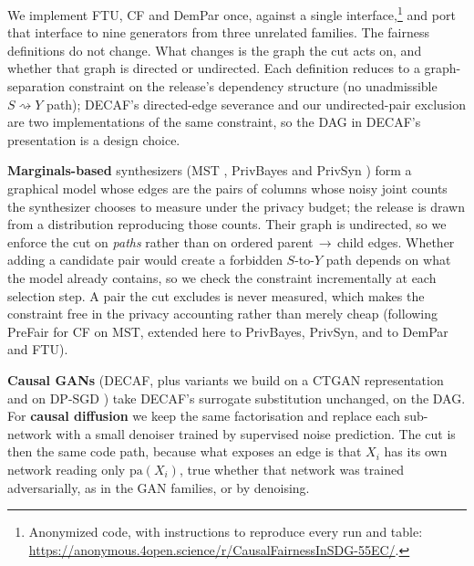 \documentclass[manuscript,screen,review]{acmart}
\begin{document}
We implement FTU, CF and DemPar once, against a single
interface,\footnote{Anonymized code, with instructions to reproduce every run
and table: \url{https://anonymous.4open.science/r/CausalFairnessInSDG-55EC/}.}
and port that interface to nine generators from three unrelated families. The
fairness definitions do not change. What changes is the graph the cut acts on,
and whether that graph is directed or undirected. Each definition reduces to
a graph-separation constraint on the release's dependency structure (no
unadmissible $S \rightsquigarrow Y$ path); DECAF's directed-edge severance and
our undirected-pair exclusion are two implementations of the same constraint,
so the DAG in DECAF's presentation is a design choice.

\textbf{Marginals-based} synthesizers (MST \citep{mckenna2021mst},
PrivBayes \citep{zhang2014privbayes} and PrivSyn \citep{zhang2021privsyn}) form a graphical model
whose edges are the pairs of columns whose noisy joint counts the synthesizer
chooses to measure under the privacy budget; the release is drawn from a
distribution reproducing those counts. Their graph is undirected, so we
enforce the cut on \emph{paths} rather than on ordered
parent\,$\rightarrow$\,child edges. Whether adding a candidate pair would
create a forbidden $S$-to-$Y$ path depends on what the model already
contains, so we check the constraint incrementally at each selection step. A
pair the cut excludes is never measured, which makes the constraint free in
the privacy accounting rather than merely cheap (following
PreFair \citep{pujol2023prefair} for CF on MST, extended here to PrivBayes,
PrivSyn, and to DemPar and FTU).

\textbf{Causal GANs} (DECAF, plus variants we build on a CTGAN
representation \citep{xu2019ctgan} and on DP-SGD \citep{abadi2016dpsgd})
take DECAF's surrogate substitution unchanged, on the DAG. For
\textbf{causal diffusion} we keep the same factorisation and replace each
sub-network with a small denoiser trained by supervised noise prediction. The
cut is then the same code path, because what exposes an edge is that $X_i$ has
its own network reading only $\mathrm{pa}(X_i)$, true whether that network
was trained adversarially, as in the GAN families, or by denoising.
\end{document}
